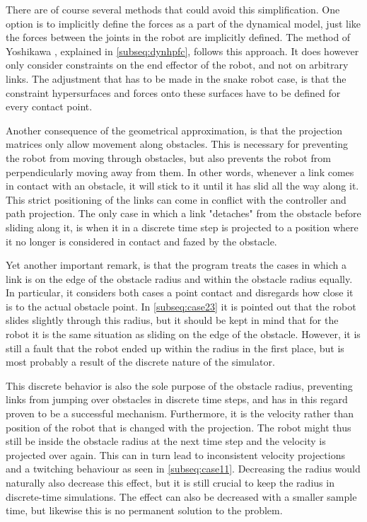 There are of course several methods that could avoid this simplification.
One option is to implicitly define the forces as a part of the dynamical model, just like the forces between the joints in the robot are implicitly defined. The method of Yoshikawa \cite{yoshikawa1987dynamic}, explained in \ref{subseq:dynhpfc}, follows this approach. It does however only consider constraints on the end effector of the robot, and not on arbitrary links. The adjustment that has to be made in the snake robot case, is that the constraint hypersurfaces and forces onto these surfaces have to be defined for every contact point.


Another consequence of the geometrical approximation, is that the projection matrices only allow movement along obstacles. This is necessary for preventing the robot from moving through obstacles, but also prevents the robot from perpendicularly moving away from them. In other words, whenever a link comes in contact with an obstacle, it will stick to it until it has slid all the way along it. This strict positioning of the links can come in conflict with the controller and path projection. The only case in which a link "detaches" from the obstacle before sliding along it, is when it in a discrete time step is projected to a position where it no longer is considered in contact and fazed by the obstacle.

Yet another important remark, is that the program treats the cases in which a link is on the edge of the obstacle radius and within the obstacle radius equally. In particular, it considers both cases a point contact and disregards how close it is to the actual obstacle point. In \ref{subseq:case23} it is pointed out that the robot slides slightly through this radius, but it should be kept in mind that for the robot it is the same situation as sliding on the edge of the obstacle. However, it is still a fault that the robot ended up within the radius in the first place, but is most probably a result of the discrete nature of the simulator.

This discrete behavior is also the sole purpose of the obstacle radius, preventing links from jumping over obstacles in discrete time steps, and has in this regard proven to be a successful mechanism.
Furthermore, it is the velocity rather than position of the robot that is changed with the projection. The robot might thus still be inside the obstacle radius at the next time step and the velocity is projected over again. This can in turn lead to inconsistent velocity projections and a twitching behaviour as seen in \ref{subseq:case11}.
Decreasing the radius would naturally also decrease this effect, but it is still crucial to keep the radius in discrete-time simulations. The effect can also be decreased with a smaller sample time, but likewise this is no permanent solution to the problem.

